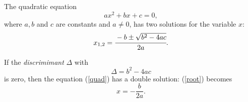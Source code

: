 The quadratic equation
\begin{equation}
  ax^2 + bx + c = 0,
  \label{quad}
\end{equation}
where \(a, b\) and \( c \) are constants and \( a \neq 0 \),
has two solutions for the variable \( x \):
\begin{equation}
  \label{root}
  x_{1,2} = \cfrac{-b \pm \sqrt{b^2 - 4ac}}{2a}.
\end{equation}

If the \emph{discrimimant} \( \Delta \) with
\[
\Delta = b^2 - 4ac 
\]
is zero, then the equation (\ref{quad}) has a double solution: (\ref{root}) becomes
\[
x = - \frac{b}{2a}. 
\]
